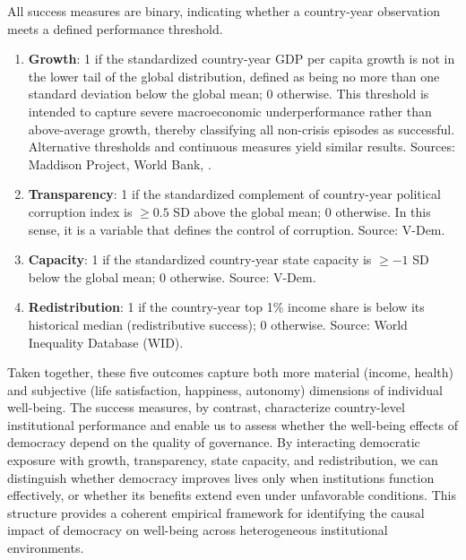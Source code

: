 \documentclass[11pt]{article}
\newcommand{\bbb}[1]{\cTwo{#1}} %
\begin{document}
All success measures are binary, indicating whether a country-year observation meets a defined performance threshold.

\begin{enumerate}[label={\arabic*.}]
	\item \textbf{Growth}: 1 if the standardized country-year GDP per capita growth is not in the lower tail of the global distribution, defined as being no more than one standard deviation below the global mean; 0 otherwise. This threshold is intended to capture severe macroeconomic underperformance rather than above-average growth, thereby classifying all non-crisis episodes as successful. Alternative thresholds and continuous measures yield similar results. Sources: Maddison Project, World Bank, \bbb{UNSD2023}.
	
	\item \textbf{Transparency}: 1 if the standardized complement of country-year political corruption index is $\ge 0.5$ SD above the global mean; 0 otherwise. In this sense, it is a variable that defines the control of corruption. Source: V-Dem.
	
	\item \textbf{Capacity}: 1 if the standardized country-year state capacity is $\ge -1$ SD below the global mean; 0 otherwise. Source: V-Dem.
	
	\item \textbf{Redistribution}: 1 if the country-year top 1\% income share is below its historical median (redistributive success); 0 otherwise. Source: World Inequality Database (WID).
\end{enumerate}

Taken together, these five outcomes capture both more material (income, health) and subjective (life satisfaction, happiness, autonomy) dimensions of individual well-being. The success measures, by contrast, characterize country-level institutional performance and enable us to assess whether the well-being effects of democracy depend on the quality of governance. By interacting democratic exposure with growth, transparency, state capacity, and redistribution, we can distinguish whether democracy improves lives only when institutions function effectively, or whether its benefits extend even under unfavorable conditions. This structure provides a coherent empirical framework for identifying the causal impact of democracy on well-being across heterogeneous institutional environments.



\vspace*{0.5cm}
\end{document}
